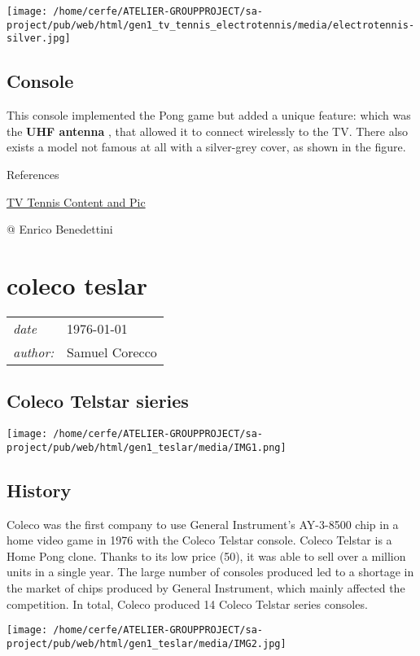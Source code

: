 \documentclass[a4paper,10pt]{book}
\newcommand{\pageHeader}[4]{
    \section{#1}
    \vspace{-0.3cm}
    \begin{table}[h!]
     \begin{tabular}{ll}
        \hline
        \textit{date} & #2 \\
        \textit{author: } & #3\\
        \hline
     \end{tabular}
    \end{table}
    \vspace{-0.3cm}
}
\begin{document}
 
 \texttt{[image: /home/cerfe/ATELIER-GROUPPROJECT/sa-project/pub/web/html/gen1\_tv\_tennis\_electrotennis/media/electrotennis-silver.jpg]}
 \subsection{Console }
 
          This console implemented the Pong game but added a unique feature: which was the  \textbf{UHF antenna } , that allowed it to connect wirelessly to the TV.
          There also exists a model not famous at all with a silver-grey cover, as shown in the figure.
         
 
 
 
 
 
 References 
 
 \href{https://it.wikipedia.org/wiki/TV_Tennis_Electrotennis}{TV Tennis Content and Pic }
 
 @ Enrico Benedettini 
 
 
 \newpage\pageHeader{coleco teslar}{1976-01-01}{Samuel Corecco}{A page about the coleco Teslar series}
 \subsection{Coleco Telstar sieries }
     
 \texttt{[image: /home/cerfe/ATELIER-GROUPPROJECT/sa-project/pub/web/html/gen1\_teslar/media/IMG1.png]}
 
 
 \subsection{History }
 Coleco was the first company to use General Instrument's AY-3-8500 chip in a home video game in 1976 with the Coleco Telstar console. Coleco Telstar is a Home Pong clone. Thanks to its low price (50), it was able to sell over a million units in a single year. The large number of consoles produced led to a shortage in the market of chips produced by General Instrument, which mainly affected the competition.  In total, Coleco produced 14 Coleco Telstar series consoles.
           
 
 \texttt{[image: /home/cerfe/ATELIER-GROUPPROJECT/sa-project/pub/web/html/gen1\_teslar/media/IMG2.jpg]}
 
 
\end{document}

